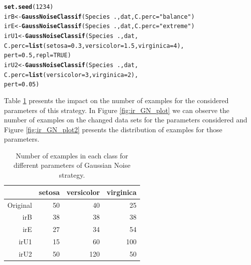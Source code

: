 \documentclass[10pt,a4paper]{article}\usepackage[]{graphicx}\usepackage[]{color}
\makeatletter
\newcommand{\hlnum}[1]{\textcolor[rgb]{0.686,0.059,0.569}{#1}}%
\newcommand{\hlstr}[1]{\textcolor[rgb]{0.192,0.494,0.8}{#1}}%
\newcommand{\hlopt}[1]{\textcolor[rgb]{0,0,0}{#1}}%
\newcommand{\hlstd}[1]{\textcolor[rgb]{0.345,0.345,0.345}{#1}}%
\newcommand{\hlkwb}[1]{\textcolor[rgb]{0.69,0.353,0.396}{#1}}%
\newcommand{\hlkwc}[1]{\textcolor[rgb]{0.333,0.667,0.333}{#1}}%
\newcommand{\hlkwd}[1]{\textcolor[rgb]{0.737,0.353,0.396}{\textbf{#1}}}%
\newenvironment{kframe}{%
 \def\at@end@of@kframe{}%
 \ifinner\ifhmode%
  \def\at@end@of@kframe{\end{minipage}}%
  \begin{minipage}{\columnwidth}%
 \fi\fi%
 \def\FrameCommand##1{\hskip\@totalleftmargin \hskip-\fboxsep
 \colorbox{shadecolor}{##1}\hskip-\fboxsep
     \hskip-\linewidth \hskip-\@totalleftmargin \hskip\columnwidth}%
 \MakeFramed {\advance\hsize-\width
   \@totalleftmargin\z@ \linewidth\hsize
   \@setminipage}}%
 {\par\unskip\endMakeFramed%
 \at@end@of@kframe}
\newenvironment{knitrout}{}{} %
\makeatother
\begin{document}
\begin{knitrout}\footnotesize
{}\color{fgcolor}\begin{kframe}
\begin{alltt}
\hlkwd{set.seed}\hlstd{(}\hlnum{1234}\hlstd{)}
\hlstd{irB}\hlkwb{<-} \hlkwd{GaussNoiseClassif}\hlstd{(Species}\hlopt{~}\hlstd{., dat,} \hlkwc{C.perc}\hlstd{=}\hlstr{"balance"}\hlstd{)}
\hlstd{irE} \hlkwb{<-} \hlkwd{GaussNoiseClassif}\hlstd{(Species}\hlopt{~}\hlstd{., dat,}\hlkwc{C.perc}\hlstd{=}\hlstr{"extreme"}\hlstd{)}
\hlstd{irU1} \hlkwb{<-} \hlkwd{GaussNoiseClassif}\hlstd{(Species}\hlopt{~}\hlstd{., dat,}
                          \hlkwc{C.perc}\hlstd{=}\hlkwd{list}\hlstd{(}\hlkwc{setosa}\hlstd{=}\hlnum{0.3}\hlstd{,} \hlkwc{versicolor}\hlstd{=}\hlnum{1.5}\hlstd{,} \hlkwc{virginica}\hlstd{=}\hlnum{4}\hlstd{),}
                          \hlkwc{pert}\hlstd{=}\hlnum{0.5}\hlstd{,} \hlkwc{repl}\hlstd{=}\hlnum{TRUE}\hlstd{)}
\hlstd{irU2} \hlkwb{<-} \hlkwd{GaussNoiseClassif}\hlstd{(Species}\hlopt{~}\hlstd{., dat,}
                          \hlkwc{C.perc}\hlstd{=}\hlkwd{list}\hlstd{(}\hlkwc{versicolor}\hlstd{=}\hlnum{3}\hlstd{,} \hlkwc{virginica}\hlstd{=}\hlnum{2}\hlstd{),}
                          \hlkwc{pert}\hlstd{=}\hlnum{0.05}\hlstd{)}
\end{alltt}
\end{kframe}
\end{knitrout}


Table \ref{tab:iris_GN_table} presents the impact on the number of examples for the considered parameters of this strategy. In Figure \ref{fig:ir_GN_plot} we can observe the number of examples on the changed data sets for the parameters considered and Figure \ref{fig:ir_GN_plot2} presents the distribution of examples for those parameters.



\begin{table}[ht]
\centering
\begin{tabular}{rrrr}
  \hline
 & setosa & versicolor & virginica \\ 
  \hline
Original &  50 &  40 &  25 \\ 
  irB &  38 &  38 &  38 \\ 
  irE &  27 &  34 &  54 \\ 
  irU1 &  15 &  60 & 100 \\ 
  irU2 &  50 & 120 &  50 \\ 
   \hline
\end{tabular}
\caption{Number of examples in each class for different parameters of Gaussian Noise strategy.} 
\label{tab:iris_GN_table}
\end{table}
\end{document}
